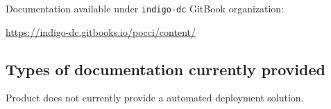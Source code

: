 \documentclass[a4wide,11pt]{article}
\begin{document}

\label{sec:func_int_test}



\label{sec:gitbook}
Documentation available under \texttt{indigo-dc} GitBook organization: \vspace{0.1em} \begin{center}\url{https://indigo-dc.gitbooks.io/pocci/content/}\end{center} 
\subsection{Types of documentation currently provided}
\begin{center}
\end{center}



\label{sec:configuration}
Product does not currently provide a automated deployment solution. 


\newpage

\end{document}
